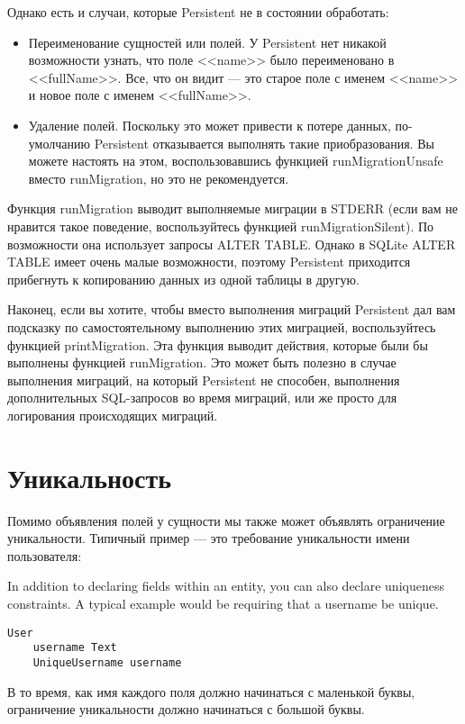 Однако есть и случаи, которые Persistent не в состоянии обработать:

\begin{itemize}
	\item Переименование сущностей или полей. У Persistent нет никакой возможности узнать, что поле <<name>> было переименовано в <<fullName>>. Все, что он видит --- это старое поле с именем <<name>> и новое поле с именем <<fullName>>.
	\item Удаление полей. Поскольку это может привести к потере данных, по-умолчанию Persistent отказывается выполнять такие приобразования. Вы можете настоять на этом, воспользовавшись функцией runMigrationUnsafe вместо runMigration, но это не рекомендуется.
\end{itemize}

Функция runMigration выводит выполняемые миграции в STDERR (если вам не нравится такое поведение, воспользуйтесь функцией runMigrationSilent). По возможности она использует запросы ALTER TABLE. Однако в SQLite ALTER TABLE имеет очень малые возможности, поэтому Persistent приходится прибегнуть к копированию данных из одной таблицы в другую.

Наконец, если вы хотите, чтобы вместо выполнения миграций Persistent дал вам подсказку по самостоятельному выполнению этих миграцией, воспользуйтесь функцией printMigration. Эта функция выводит действия, которые были бы выполнены функцией runMigration. Это может быть полезно в случае выполнения миграций, на который Persistent не способен, выполнения дополнительных SQL-запросов во время миграций, или же просто для логирования происходящих миграций.

\section{Уникальность} %

Помимо объявления полей у сущности мы также может объявлять ограничение уникальности. Типичный пример --- это требование уникальности имени пользователя:

In addition to declaring fields within an entity, you can also declare uniqueness constraints. A typical example would be requiring that a username be unique.

\begin{lstlisting}
User
    username Text
    UniqueUsername username
\end{lstlisting}

В то время, как имя каждого поля должно начинаться с маленькой буквы, ограничение уникальности должно начинаться с большой буквы.


